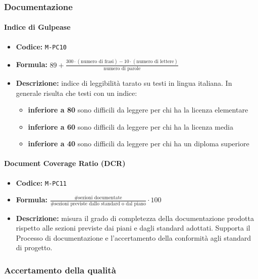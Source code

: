 \documentclass[a4paper,12pt]{article}
\begin{document}
\subsubsection{Documentazione}
\paragraph{Indice di Gulpease}
\begin{itemize}
    \item \textbf{Codice:} \texttt{M-PC10}
    \item \textbf{Formula:} $89 + \frac{300 \cdot (\text{numero di frasi}) - 10 \cdot (\text{numero di lettere})}{\text{numero di parole}}$
    \item \textbf{Descrizione:} indice di leggibilità tarato su testi in lingua italiana. In generale risulta che testi con un indice:
    \begin{itemize}
        \item \textbf{inferiore a 80} sono difficili da leggere per chi ha la licenza elementare
        \item \textbf{inferiore a 60} sono difficili da leggere per chi ha la licenza media
        \item \textbf{inferiore a 40} sono difficili da leggere per chi ha un diploma superiore
    \end{itemize}
\end{itemize}

\paragraph{Document Coverage Ratio (DCR)}
\begin{itemize}
    \item \textbf{Codice:} \texttt{M-PC11}
    \item \textbf{Formula:} $\frac{\text{\# sezioni documentate}}{\text{\# sezioni previste dallo standard o dal piano}} \cdot 100$
    \item \textbf{Descrizione:} misura il grado di completezza della documentazione prodotta rispetto alle sezioni previste dai piani e dagli standard adottati. 
    Supporta il Processo di documentazione e l’accertamento della conformità agli standard di progetto.
\end{itemize}

\subsubsection{Accertamento della qualità}
\end{document}
